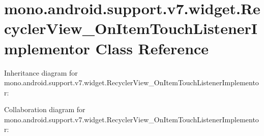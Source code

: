 \hypertarget{classmono_1_1android_1_1support_1_1v7_1_1widget_1_1_recycler_view___on_item_touch_listener_implementor}{}\section{mono.\+android.\+support.\+v7.\+widget.\+Recycler\+View\+\_\+\+On\+Item\+Touch\+Listener\+Implementor Class Reference}
\label{classmono_1_1android_1_1support_1_1v7_1_1widget_1_1_recycler_view___on_item_touch_listener_implementor}


Inheritance diagram for mono.\+android.\+support.\+v7.\+widget.\+Recycler\+View\+\_\+\+On\+Item\+Touch\+Listener\+Implementor\+:


Collaboration diagram for mono.\+android.\+support.\+v7.\+widget.\+Recycler\+View\+\_\+\+On\+Item\+Touch\+Listener\+Implementor\+:
